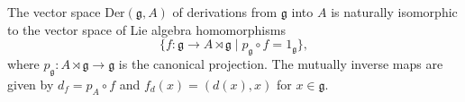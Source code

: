 The vector space $\text{Der}(\mathfrak{g}, A)$ of derivations from $\mathfrak{g}$ into $A$ is naturally isomorphic to the vector space of Lie algebra homomorphisms
$$\{ f : \mathfrak{g} \to A \rtimes \mathfrak{g} \mid p_{\mathfrak{g}} \circ f = 1_{\mathfrak{g}} \},$$
where $p_{\mathfrak{g}} : A \rtimes \mathfrak{g} \to \mathfrak{g}$ is the canonical projection. The mutually inverse maps are given by $d_f = p_A \circ f$ and $f_d(x) = (d(x), x)$ for $x \in \mathfrak{g}$.
